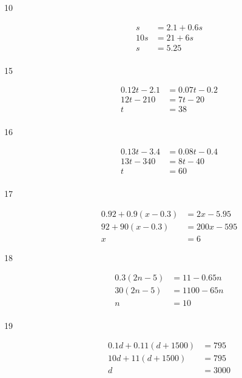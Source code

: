 \documentclass[letterpaper, landscape]{exam}
\begin{document}
\begin{description}
      \item[10]
        \begin{align*}
          s   & = 2.1 + 0.6s \\
          10s & = 21 + 6s \\
          s   & = \boxed{ 5.25 } \\
        \end{align*}

      \item[15]
        \begin{align*}
          0.12t - 2.1 & = 0.07t - 0.2 \\
          12t - 210   & = 7t - 20 \\
          t           & = \boxed{ 38 } \\
        \end{align*}

      \item[16]
        \begin{align*}
          0.13t - 3.4      & = 0.08t - 0.4 \\
          13t - 340        & = 8t - 40 \\
          t                & = \boxed{ 60 } \\
        \end{align*}

      \item[17]
        \begin{align*}
          0.92 + 0.9(x - 0.3)      & = 2x - 5.95 \\
          92 + 90(x - 0.3)         & = 200x - 595 \\
          x                        & = \boxed{ 6 }
        \end{align*}

      \item[18]
        \begin{align*}
          0.3(2n - 5) & = 11 - 0.65n \\
          30(2n - 5)  & = 1100 - 65n \\
          n           & = \boxed{ 10 } \\
        \end{align*}

      \item[19]
        \begin{align*}
          0.1d + 0.11 (d + 1500) & = 795 \\
          10d + 11 (d + 1500)    & = 795 \\
          d                      & = \boxed{ 3000 } \\
        \end{align*}


\end{description}
\end{document}
